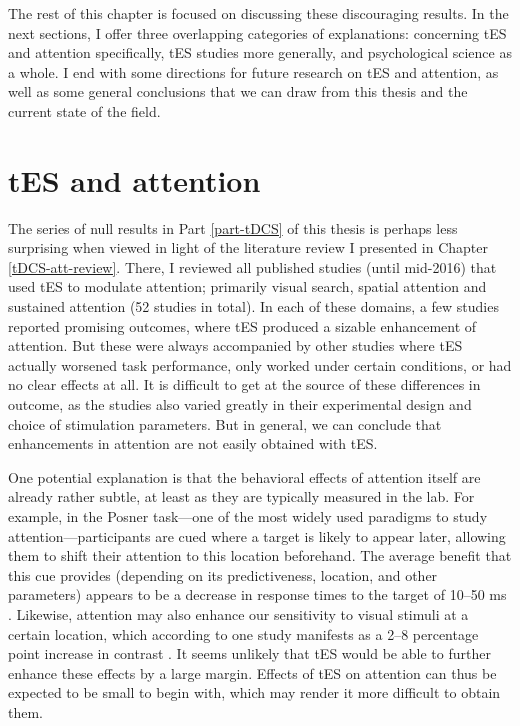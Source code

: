 \documentclass[11pt,]{memoir}
\begin{document}
The rest of this chapter is focused on discussing these discouraging results. In the next sections, I offer three overlapping categories of explanations: concerning tES and attention specifically, tES studies more generally, and psychological science as a whole. I end with some directions for future research on tES and attention, as well as some general conclusions that we can draw from this thesis and the current state of the field.

\hypertarget{tes-and-attention}{%
\section{tES and attention}\label{tes-and-attention}}

The series of null results in Part \ref{part-tDCS} of this thesis is perhaps less surprising when viewed in light of the literature review I presented in Chapter \ref{tDCS-att-review}. There, I reviewed all published studies (until mid-2016) that used tES to modulate attention; primarily visual search, spatial attention and sustained attention (52 studies in total). In each of these domains, a few studies reported promising outcomes, where tES produced a sizable enhancement of attention. But these were always accompanied by other studies where tES actually worsened task performance, only worked under certain conditions, or had no clear effects at all. It is difficult to get at the source of these differences in outcome, as the studies also varied greatly in their experimental design and choice of stimulation parameters. But in general, we can conclude that enhancements in attention are not easily obtained with tES.

One potential explanation is that the behavioral effects of attention itself are already rather subtle, at least as they are typically measured in the lab. For example, in the Posner task---one of the most widely used paradigms to study attention---participants are cued where a target is likely to appear later, allowing them to shift their attention to this location beforehand. The average benefit that this cue provides (depending on its predictiveness, location, and other parameters) appears to be a decrease in response times to the target of 10--50 ms \autocite{Chica2014}. Likewise, attention may also enhance our sensitivity to visual stimuli at a certain location, which according to one study manifests as a 2--8 percentage point increase in contrast \autocite{Carrasco2004}. It seems unlikely that tES would be able to further enhance these effects by a large margin. Effects of tES on attention can thus be expected to be small to begin with, which may render it more difficult to obtain them.
\end{document}
